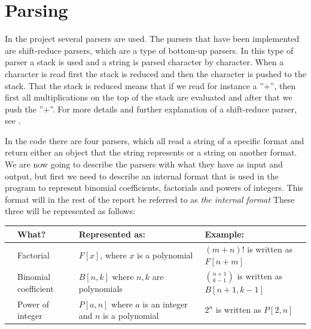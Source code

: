 \section{Parsing}
In the project several parsers are used. The parsers that have been implemented are shift-reduce parsers, which are a type of bottom-up parsers. In this type of parser a stack is used and a string is parsed character by character. When a character is read first the stack is reduced and then the character is pushed to the stack. That the stack is reduced means that if we read for instance a ''$+$'', then first all multiplications on the top of the stack are evaluated and after that we push the ''$+$''. For more details and further explanation of a shift-reduce parser, see .

In the code there are four parsers, which all read a string of a specific format and return either an object that the string represents or a string on another format. We are now going to describe the parsers with what they have as input and output, but first we need to describe an internal format that is used in the program to represent binomial coefficients, factorials and powers of integers. This format will in the rest of the report be referred to as \textit{the internal format} These three will be represented as follows:
\begin{center}
  \begin{tabular}{C{1mm}C{3cm}|C{4cm}|C{4cm}}
    &\textbf{What?}   & \textbf{Represented as:} & \textbf{Example:} \\ \hline
    &Factorial & $F[x]$, where $x$ is a polynomial & $(m+n)!$ is written as $F[n+m]$ \\ \hline
    &Binomial coefficient & $B[n,k]$ where $n,k$ are polynomials & $\binom{n+1}{k-1}$ is written as $B[n+1,k-1]$ \\ \hline
    &Power of integer & $P[a,n]$ where $a$ is an integer and $n$ is a polynomial & $2^n$ is written as $P[2,n]$ \\
  \end{tabular}
\end{center}

